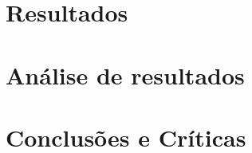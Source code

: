 \documentclass[%
  reprint,
  nofootinbib,
  amsmath,amssymb,
  aps,
  10pt,
  a4paper
]{revtex4-1}
\begin{document}
\section{Resultados}
\label{s:resul}







\section{Análise de resultados}
\label{s:aresul}





\section{Conclusões e Críticas}
\label{s:conclu}







\nocite{*}
{}
\end{document}
